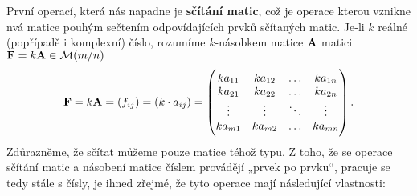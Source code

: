       První operací, která nás napadne je \textbf{sčítání matic}, což je operace kterou vznikne nvá 
      matice pouhým sečtením odpovídajících prvků sčítaných matic. 
      Je-li \(k\) reálné (popřípadě i komplexní) číslo, rozumíme \(k\)-násobkem matice \(\mathbf{A}\) 
      matici \( \mathbf{F} = k\mathbf{A}\in \mathcal{M}(m/n)\)
      \begin{equation}\label{mai:eq78}
        \mathbf{F} = k\mathbf{A} = (f_{ij}) = (k\cdot a_{ij}) = 
                    \begin{pmatrix}
                       ka_{11} & ka_{12} & \ldots & ka_{1n} \\
                       ka_{21} & ka_{22} & \ldots & ka_{2n} \\
                       \vdots  & \vdots  & \ddots & \vdots  \\
                       ka_{m1} & ka_{m2} & \ldots & ka_{mn}
                    \end{pmatrix}.
      \end{equation}
      Zdůrazněme, že sčítat můžeme pouze matice téhož typu. Z toho, že se operace sčítání matic a 
      násobení matice číslem provádějí „prvek po prvku“, pracuje se tedy stále s čísly, je ihned 
      zřejmé, že tyto operace mají následující vlastnosti:
      
